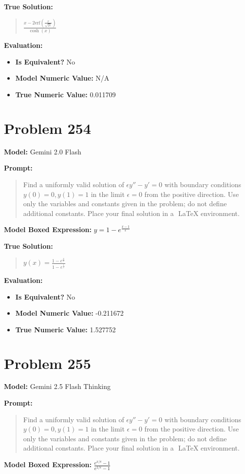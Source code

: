 \documentclass{article}
\begin{document}
{\textbf{True Solution:}
\begin{quote}
$\frac{x-2\text{erf}(\frac{x}{\sqrt{2\epsilon}})}{\cosh(x)}$
\end{quote}

\textbf{Evaluation:}
\begin{itemize}
\item \textbf{Is Equivalent?} No
\item \textbf{Model Numeric Value:} N/A
\item \textbf{True Numeric Value:} 0.011709
\end{itemize}
\vspace{1cm}
\section*{Problem 254}
\textbf{Model:} Gemini 2.0 Flash

\textbf{Prompt:}
\begin{quote}
Find a uniformly valid solution of $ \epsilon y'' - y' = 0$ with boundary conditions $ y(0) = 0, y(1) = 1$ in the limit $\epsilon = 0$ from the positive direction. Use only the variables and constants given in the problem; do not define additional constants. Place your final solution in a $\boxed{}$ LaTeX environment.
\end{quote}
\textbf{Model Boxed Expression:} $y = 1 - e^{\frac{x-1}{\epsilon}}$

\textbf{True Solution:}
\begin{quote}
$y(x) = \frac{1-e^{\frac{x}{\epsilon}}}{1-e^{\frac{1}{\epsilon}}}$
\end{quote}

\textbf{Evaluation:}
\begin{itemize}
\item \textbf{Is Equivalent?} No
\item \textbf{Model Numeric Value:} -0.211672
\item \textbf{True Numeric Value:} 1.527752
\end{itemize}
\vspace{1cm}
\section*{Problem 255}
\textbf{Model:} Gemini 2.5 Flash Thinking

\textbf{Prompt:}
\begin{quote}
Find a uniformly valid solution of $ \epsilon y'' - y' = 0$ with boundary conditions $ y(0) = 0, y(1) = 1$ in the limit $\epsilon = 0$ from the positive direction. Use only the variables and constants given in the problem; do not define additional constants. Place your final solution in a $\boxed{}$ LaTeX environment.
\end{quote}
\textbf{Model Boxed Expression:} $\frac{e^{x/\epsilon} - 1}{e^{1/\epsilon} - 1}$

}
\end{document}
